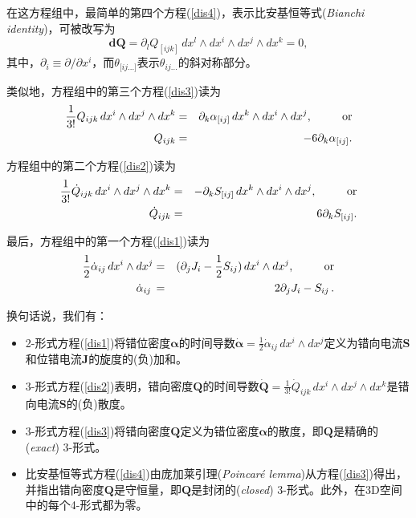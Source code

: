 \documentclass[11pt,fontset=founder]{ctexart}
\begin{document}
在这方程组中，最简单的第四个方程(\ref{dis4})，表示比安基恒等式(\emph{Bianchi identity})，可被改写为
\[
\mathbf{dQ}=\partial _{l}Q_{[ijk]}\,dx^{l}\wedge dx^{i}\wedge
dx^{j}\wedge dx^{k}=0,
\]
其中，$\partial _{i}\equiv\partial /\partial x^{i}$，而$\theta _{\lbrack ij...]}$表示$\theta _{ij...}$的斜对称部分。

类似地，方程组中的第三个方程(\ref{dis3})读为
\begin{eqnarray*}
\frac{1}{3!}Q_{ijk}\,dx^{i}\wedge dx^{j}\wedge dx^{k} &=&\partial
_{k}\alpha
_{\lbrack ij]}\,dx^{k}\wedge dx^{i}\wedge dx^{j},\text{\qquad or} \\
Q_{ijk} &=&-6\partial _{k}\alpha _{\lbrack ij]}.
\end{eqnarray*}

方程组中的第二个方程(\ref{dis2})读为
\begin{eqnarray*}
\frac{1}{3!}\dot{Q}_{ijk}\,dx^{i}\wedge dx^{j}\wedge dx^{k}
&=&-\partial
_{k}S_{[ij]}\,dx^{k}\wedge dx^{i}\wedge dx^{j},\text{\qquad or} \\
\dot{Q}_{ijk} &=&6\partial _{k}S_{[ij]}.
\end{eqnarray*}

最后，方程组中的第一个方程(\ref{dis1})读为
\begin{eqnarray*}
\frac{1}{2}\dot{\alpha}_{ij}\,dx^{i}\wedge dx^{j} &=&(\partial _{j}J_{i}-%
\frac{1}{2}S_{ij})\,dx^{i}\wedge dx^{j},\text{\qquad or} \\
\dot{\alpha}_{ij}\, &=&2\partial _{j}J_{i}-S_{ij}\,.
\end{eqnarray*}

换句话说，我们有：

\begin{itemize}
\item  2-形式方程(\ref{dis1})将错位密度$\mathbf{\alpha }$的时间导数$\boldsymbol{\dot{\alpha}=}\frac{1}{2}\dot{\alpha}_{ij}\,dx^{i}\wedge dx^{j}$定义为错向电流$\mathbf{S}$和位错电流$\mathbf{J}$的旋度的(负)加和。

\item  3-形式方程(\ref{dis2})表明，错向密度$\mathbf{Q}$的时间导数$\boldsymbol{\dot{\mathbf Q}=}\frac{1}{3!}\dot{Q}_{ijk}\,dx^{i}\wedge dx^{j}\wedge dx^{k}$是错向电流$\mathbf{S}$的(负)散度。

\item  3-形式方程(\ref{dis3})将错向密度$\mathbf{Q}$定义为错位密度$\mathbf{\alpha }$的散度，即$\mathbf{Q}$是精确的(\emph{exact}) 3-形式。

\item  比安基恒等式方程(\ref{dis4})由庞加莱引理(\textit{Poincar\'{e} lemma})从方程(\ref{dis3})得出，并指出错向密度$\mathbf{Q}$是守恒量，即$\mathbf{Q}$是封闭的(\emph{closed}) 3-形式。此外，在3D空间中的每个4-形式都为零。
\end{itemize}
\end{document}
